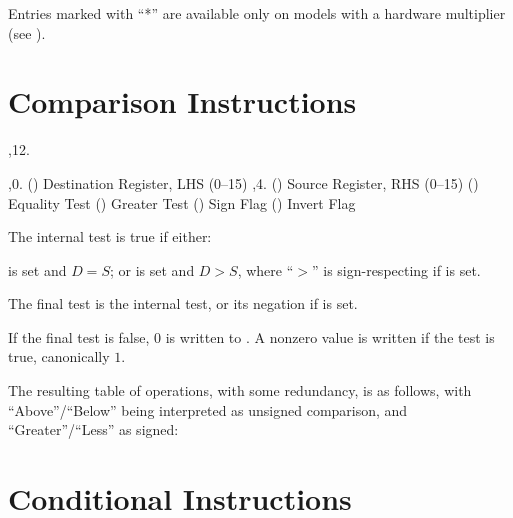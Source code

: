 \bigskip
{
	\offinterlineskip
}
\bigskip

Entries marked with ``*'' are available only on models with a hardware
multiplier (see ).

\section{Comparison Instructions}

\noindent\ins{},12. 

\li \ins{},0. () Destination Register, LHS (0--15)
\li \ins{},4. () Source Register, RHS (0--15)
\li \ins{} () Equality Test
\li \ins{} () Greater Test
\li \ins{} () Sign Flag
\li \ins{} () Invert Flag

The internal test is true if either:

\li {} is set and $D = S$; or
\li {} is set and $D > S$, where ``$>$'' is sign-respecting if 
is set.

The final test is the internal test, or its negation if  is set.

If the final test is false, $0$ is written to . A nonzero value is
written if the test is true, canonically $1$.

The resulting table of operations, with some redundancy, is as follows, with
``Above''/``Below'' being interpreted as unsigned comparison, and
``Greater''/``Less'' as signed:

\bigskip
{
	\tabskip=3pt
}
\bigskip

\section{Conditional Instructions}

